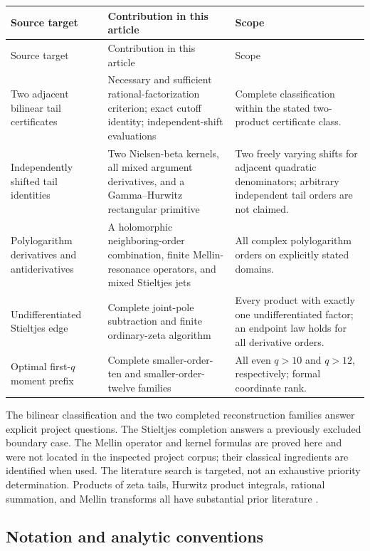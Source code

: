 \begin{longtable}{@{}>{\raggedright\arraybackslash}p{}>{\raggedright\arraybackslash}p{}>{\raggedright\arraybackslash}p{}@{}}
\toprule
Source target & Contribution in this article & Scope\\
\midrule\endfirsthead
\toprule Source target & Contribution in this article & Scope\\\midrule\endhead
Two adjacent bilinear tail certificates \cite{tail-alternating}
& Necessary and sufficient rational-factorization criterion; exact
cutoff identity; independent-shift evaluations
& Complete classification within the stated two-product certificate class.\\[5pt]
Independently shifted tail identities
& Two Nielsen-beta kernels, all mixed argument derivatives, and a
Gamma--Hurwitz rectangular primitive
& Two freely varying shifts for adjacent quadratic denominators;
arbitrary independent tail orders are not claimed.\\[5pt]
Polylogarithm derivatives and antiderivatives
& A holomorphic neighboring-order combination, finite Mellin-resonance
operators, and mixed Stieltjes jets
& All complex polylogarithm orders on explicitly stated domains.\\[5pt]
Undifferentiated Stieltjes edge \cite{tail-polygamma}
& Complete joint-pole subtraction and finite ordinary-zeta algorithm
& Every product with exactly one undifferentiated factor; an endpoint
law holds for all derivative orders.\\[5pt]
Optimal first-$q$ moment prefix \cite{tail-alternating,tail-quartic}
& Complete smaller-order-ten and smaller-order-twelve families
& All even $q>10$ and $q>12$, respectively; formal coordinate rank.\\
\bottomrule
\end{longtable}

The bilinear classification and the two completed reconstruction families
answer explicit project questions. The Stieltjes completion answers a
previously excluded boundary case. The Mellin operator and kernel formulas
are proved here and were not located in the inspected project corpus;
their classical ingredients are identified when used. The literature
search is targeted, not an exhaustive priority determination. Products
of zeta tails, Hurwitz product integrals, rational summation, and Mellin
transforms all have substantial prior literature
\cite{Hoffman,EspinosaMoll,ShpotParis,DLMFPolylog}.

\subsection{Notation and analytic conventions}

